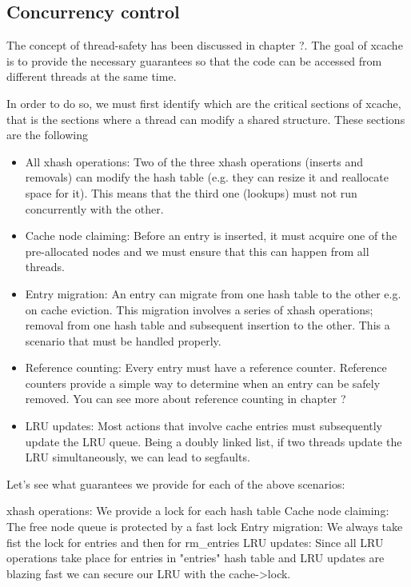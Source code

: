 \subsection{Concurrency control}

The concept of thread-safety has been discussed in chapter ?. The goal of xcache 
is to provide the necessary guarantees so that the code can be accessed from 
different threads at the same time.

In order to do so, we must first identify which are the critical sections of 
xcache, that is the sections where a thread can modify a shared structure. These 
sections are the following

\begin{itemize}
	\item All xhash operations: Two of the three xhash operations (inserts and 
		removals) can modify the hash table (e.g. they can resize it and 
		reallocate space for it). This means that the third one (lookups) must 
		not run concurrently with the other.
	\item Cache node claiming: Before an entry is inserted, it must	acquire one 
		of the pre-allocated nodes and we must ensure that this can happen from 
		all threads.
	\item Entry migration: An entry can migrate from one hash table to the other 
		e.g. on cache eviction. This migration involves a series of xhash 
		operations; removal from one hash table and subsequent insertion to the 
		other. This a scenario that must be handled properly.
	\item Reference counting: Every entry must have a reference counter.  
		Reference counters provide a simple way to determine when an entry can 
		be safely removed. You can see more about reference counting in chapter 
		?
	\item LRU updates: Most actions that involve cache entries must subsequently 
		update the LRU queue. Being a doubly linked list, if two threads update 
		the LRU simultaneously, we can lead to segfaults.
\end{itemize}

Let's see what guarantees we provide for each of the above scenarios:

xhash operations: We provide a lock for each hash table
Cache node claiming: The free node queue is protected by a fast lock
Entry migration: We always take fist the lock for entries and then for 
rm\_entries
LRU updates: Since all LRU operations take place for entries in "entries" hash 
table and LRU updates are blazing fast we can secure our LRU with the 
cache->lock.

